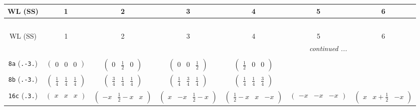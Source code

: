 \documentclass[fleqn,9pt,landscape]{jsarticle}
\begin{document}
\begin{center}
\renewcommand{\arraystretch}{1.2}
\begin{longtable}{ccccccc}
 \hline \hline
WL (SS) & 1 & 2 & 3 & 4 & 5 & 6 \\ \hline \endfirsthead

\multicolumn{6}{l}{\tablename\ \thetable{}} \\
 \hline \hline
WL (SS) & 1 & 2 & 3 & 4 & 5 & 6 \\ \hline \endhead

 \hline \hline
\multicolumn{6}{r}{\footnotesize\it continued ...} \\ \endfoot

 \hline \hline
\multicolumn{6}{r}{} \\ \endlastfoot

{\tt 8a} ({\tt .-3.}) & $ \begin{pmatrix} 0 & 0 & 0 \end{pmatrix} $ & $ \begin{pmatrix} 0 & \frac{1}{2} & 0 \end{pmatrix} $ & $ \begin{pmatrix} 0 & 0 & \frac{1}{2} \end{pmatrix} $ & $ \begin{pmatrix} \frac{1}{2} & 0 & 0 \end{pmatrix} $ & $  $ & $  $ \\ \hline
{\tt 8b} ({\tt .-3.}) & $ \begin{pmatrix} \frac{1}{4} & \frac{1}{4} & \frac{1}{4} \end{pmatrix} $ & $ \begin{pmatrix} \frac{3}{4} & \frac{1}{4} & \frac{1}{4} \end{pmatrix} $ & $ \begin{pmatrix} \frac{1}{4} & \frac{3}{4} & \frac{1}{4} \end{pmatrix} $ & $ \begin{pmatrix} \frac{1}{4} & \frac{1}{4} & \frac{3}{4} \end{pmatrix} $ & $  $ & $  $ \\ \hline
{\tt 16c} ({\tt .3.}) & $ \begin{pmatrix} x & x & x \end{pmatrix} $ & $ \begin{pmatrix} - x & \frac{1}{2} - x & x \end{pmatrix} $ & $ \begin{pmatrix} x & - x & \frac{1}{2} - x \end{pmatrix} $ & $ \begin{pmatrix} \frac{1}{2} - x & x & - x \end{pmatrix} $ & $ \begin{pmatrix} - x & - x & - x \end{pmatrix} $ & $ \begin{pmatrix} x & x + \frac{1}{2} & - x \end{pmatrix} $ \\

\end{longtable}
\end{center}
\end{document}
